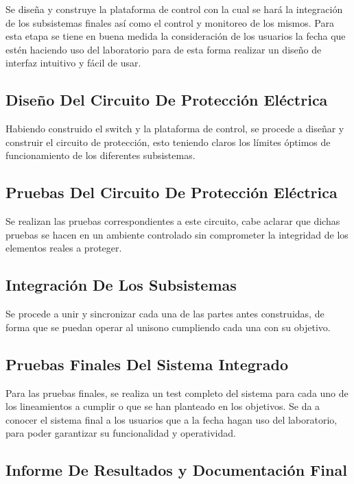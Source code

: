 Se diseña y construye la plataforma de control con la cual se hará la integración de los subsistemas finales así como el control y monitoreo de los mismos. Para esta etapa se tiene en buena medida la consideración de los usuarios  la fecha que estén haciendo uso del laboratorio para de esta forma realizar un diseño de interfaz intuitivo y fácil de usar. 
 
\subsection{Diseño Del Circuito De Protección Eléctrica}

Habiendo construido el switch y la plataforma de control, se procede a diseñar y construir el circuito de protección, esto teniendo claros los límites óptimos de funcionamiento de los diferentes subsistemas.

\subsection{Pruebas Del Circuito De Protección Eléctrica}

Se realizan las pruebas correspondientes a este circuito, cabe aclarar que dichas pruebas se hacen en un ambiente controlado sin comprometer la integridad de los elementos reales a proteger. 

\subsection{Integración De Los Subsistemas} 

Se procede a unir y sincronizar cada una de las partes antes construidas, de forma que se puedan operar al unisono cumpliendo cada una con su objetivo. 

\subsection{Pruebas Finales Del Sistema Integrado}

Para las pruebas finales, se realiza un test completo del sistema para cada uno de los lineamientos a cumplir o que se han planteado en los objetivos. Se da a conocer el sistema final a los usuarios que a la fecha hagan uso del laboratorio, para poder garantizar su funcionalidad y operatividad. 

\subsection{Informe De Resultados y Documentación Final }

